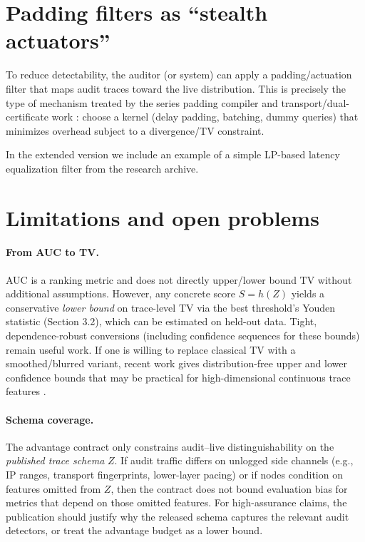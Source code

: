 \documentclass[11pt]{article}
\newcommand{\TV}{\mathrm{TV}}
\begin{document}
\section{Padding filters as ``stealth actuators''}
To reduce detectability, the auditor (or system) can apply a padding/actuation filter that maps audit traces toward the live distribution.
This is precisely the type of mechanism treated by the series padding compiler and transport/dual-certificate work \cite{series:schedcompiler,series:knapsacktransport}:
choose a kernel (delay padding, batching, dummy queries) that minimizes overhead subject to a divergence/TV constraint.

In the extended version we include an example of a simple LP-based latency equalization filter from the research archive.



\section{Limitations and open problems}
\paragraph{From AUC to TV.}
AUC is a ranking metric and does not directly upper/lower bound $\TV$ without additional assumptions.
However, any concrete score $S=h(Z)$ yields a conservative \emph{lower bound} on trace-level TV via the best threshold's Youden statistic
(Section 3.2), which can be estimated on held-out data.
Tight, dependence-robust conversions (including confidence sequences for these bounds) remain useful work.
If one is willing to replace classical TV with a smoothed/blurred variant, recent work gives distribution-free upper and lower confidence bounds that may be practical for high-dimensional continuous trace features \cite{hore2026blurredtv}.

\paragraph{Schema coverage.}
The advantage contract only constrains audit--live distinguishability on the \emph{published trace schema} $Z$.
If audit traffic differs on unlogged side channels (e.g., IP ranges, transport fingerprints, lower-layer pacing) or if nodes condition on features omitted from $Z$,
then the contract does not bound evaluation bias for metrics that depend on those omitted features.
For high-assurance claims, the publication should justify why the released schema captures the relevant audit detectors, or treat the advantage budget as a lower bound.
\end{document}
